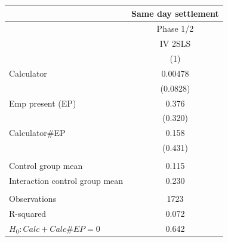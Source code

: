 \begin{tabular}{lc}
\toprule
      & Same day settlement \\
\midrule
\midrule
      & Phase 1/2 \\
\midrule
      & IV 2SLS \\
\midrule
\midrule
      & (1) \\
\midrule
\midrule
Calculator & 0.00478 \\
      & (0.0828) \\
Emp present (EP) & 0.376 \\
      & (0.320) \\
Calculator\#EP & 0.158 \\
      & (0.431) \\
      &  \\
\midrule
Control group mean & 0.115 \\
Interaction control group mean & 0.230 \\
\midrule
      &  \\
\midrule
Observations & 1723 \\
R-squared & 0.072 \\
$H_0 : Calc + Calc\# EP = 0$ & 0.642 \\
\bottomrule
\bottomrule
\end{tabular}%
